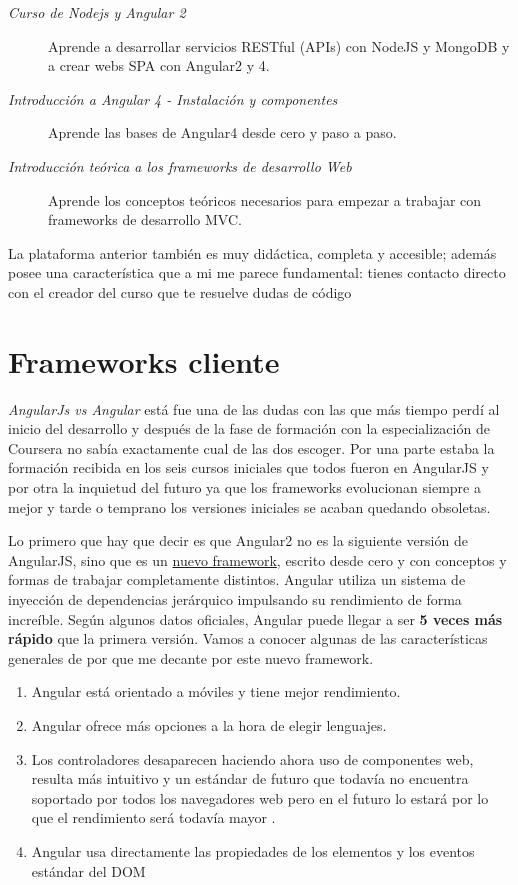 \begin{description}
	\item[\emph{Curso de Nodejs y Angular 2}] Aprende a desarrollar servicios RESTful (APIs) con NodeJS y MongoDB y a crear webs SPA con Angular2 y 4. \cite{curso1}
	\item[ \emph{Introducción a Angular 4 - Instalación y componentes}] Aprende las bases de Angular4 desde cero y paso a paso. \cite{curso2}
	\item[ \emph{Introducción teórica a los frameworks de desarrollo Web}] Aprende los conceptos teóricos necesarios para empezar a trabajar con frameworks de desarrollo MVC. \cite{curso3}
\end{description}


La plataforma anterior también es muy didáctica, completa y accesible; además posee una característica que a mi me parece fundamental: tienes contacto directo con el creador del curso que te resuelve dudas de código


 \section{Frameworks cliente}\label{cliente}
 
 \emph{AngularJs vs Angular } está fue una de las dudas con las que más tiempo perdí al inicio del desarrollo y después de la fase de formación con la especialización de Coursera no sabía exactamente cual de las dos escoger. Por una parte estaba la formación recibida en los seis cursos iniciales que todos fueron en AngularJS y por otra la inquietud del futuro ya que los frameworks evolucionan siempre a mejor y tarde o temprano los versiones iniciales se acaban quedando obsoletas. 
 
 Lo primero que hay que decir es que Angular2 no es la siguiente versión de AngularJS, sino que es un \underline{nuevo framework}, escrito desde cero y con conceptos y formas de trabajar completamente distintos. Angular utiliza un sistema de inyección de dependencias jerárquico impulsando su rendimiento de forma increíble.  Según algunos datos oficiales, Angular puede llegar a ser \textbf{5 veces más rápido} que la primera versión.  Vamos a conocer algunas de las características generales de por que me decante por este nuevo framework. 
 
 \begin{enumerate}
	\item Angular está orientado a móviles y tiene mejor rendimiento.
	\item Angular ofrece más opciones a la hora de elegir lenguajes.
	\item Los controladores desaparecen haciendo ahora uso de componentes web, resulta más intuitivo y un estándar de futuro que todavía no encuentra soportado por todos los navegadores web pero en el futuro lo estará por lo que el rendimiento será todavía mayor .
	\item Angular usa directamente las propiedades de los elementos y los eventos estándar del DOM
\end{enumerate}
 
